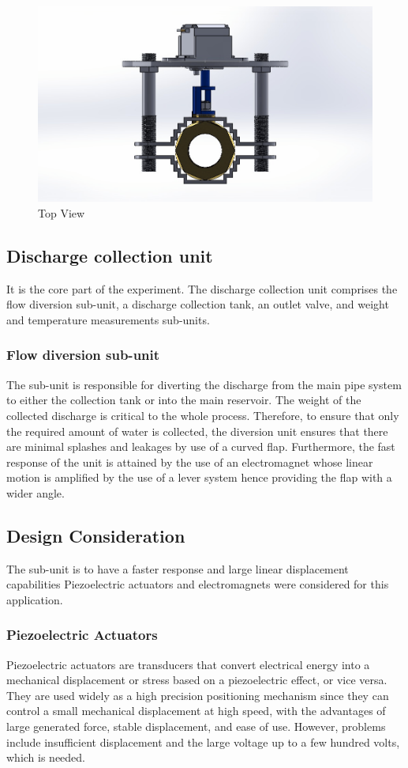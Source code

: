 \begin{figure}[ht]
\includegraphics[width=0.9\linewidth]{Figures/Image1.png}
\centering
\caption{Top View }
\label{fig:Image1}
\end{figure}

\subsection{Discharge collection unit}
It is the core part of the experiment. The discharge collection unit comprises the flow diversion sub-unit, a discharge collection tank, an outlet valve, and weight and temperature measurements sub-units.
\subsubsection{Flow diversion sub-unit}
\par
The sub-unit is responsible for diverting the discharge from the main pipe system to either the collection tank or into the main reservoir. The weight of the collected discharge is critical to the whole process. Therefore, to ensure that only the required amount of water is collected, the diversion unit ensures that there are minimal splashes and leakages by use of a curved flap. Furthermore, the fast response of the unit is attained by the use of an electromagnet whose linear motion is amplified by the use of a lever system hence providing the flap with a wider angle.
\subsection{Design Consideration}
The sub-unit is to have a faster response and large linear displacement capabilities Piezoelectric actuators and electromagnets were considered for this application.
\subsubsection{Piezoelectric Actuators}
\par
Piezoelectric actuators are transducers that convert electrical energy into a mechanical displacement or stress based on a piezoelectric effect, or vice versa. They are used widely as a high precision positioning mechanism since they can control a small mechanical displacement at high speed, with the advantages of large generated force, stable displacement, and ease of use. However, problems include insufficient displacement and the large voltage up to a few hundred volts, which is needed.
